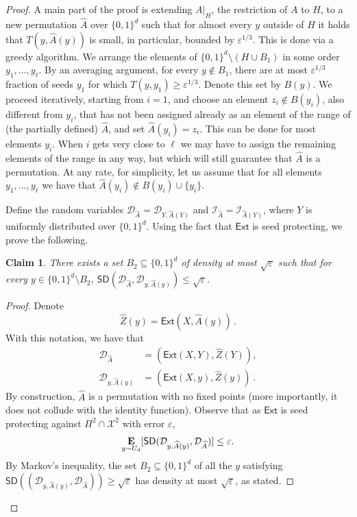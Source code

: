 \documentclass[11pt]{article}
\numberwithin{equation}{section}
\newtheorem{claim}[theorem]{Claim}
\theoremstyle{definition}
\theoremstyle{plain}
\newcommand{\ext}{\mathsf{Ext}}
\newcommand{\eps}{\varepsilon}
\newcommand{\perfam}{\Pi}
\newcommand{\nc}{\mathcal{X}}
\newcommand{\E}{\mathop{\bf E\/}}
\def\SD{\ensuremath{\mathsf{SD}}}
\begin{document}
\begin{proof}
                A main part of the proof is extending $A|_H$, the restriction of $A$ to $H$, to a new permutation $\widehat{A}$ over $\{0,1\}^d$ such that for almost every $y$ outside of $H$ it holds that $T(y,\widehat{A}(y))$ is small, in particular, bounded by $\eps^{1/3}$. This is done via a greedy algorithm. We arrange the elements of $\{0,1\}^d \setminus (H \cup B_1)$ in some order $y_1,\ldots,y_\ell$. By an averaging argument, for every $y \not\in B_1$, there are at most $\eps^{1/3}$ fraction of seeds $y_1$ for which $T(y,y_1) \ge \eps^{1/3}$. Denote this set by $B(y)$. We proceed iteratively, starting from $i = 1$, and choose an element $z_i \not\in B(y_i)$, also different from $y_i$, that has not been assigned already as %
an element of the range %
of (the partially defined) $\widehat{A}$, 
and set $\widehat{A}(y_i) = z_i$. This can be done for most
%
elements $y_i$.  %
%
%
When $i$ gets very close to $\ell$ we may have to assign the remaining 
%
elements of the range %
in any way, but which will still
%
 guarantee that $\widehat{A}$ is a permutation. At any rate, for simplicity, let us assume that for all elements $y_1,\ldots,y_\ell$ we have that $\widehat{A}(y_i) \not\in B(y_i) \cup \{y_i\}$.
		

Define the random variables $\mathcal{D}_{\widehat{A}} = \mathcal{D}_{Y,\widehat{A}(Y)}$ and 
$\mathcal{I}_{\widehat{A}} = \mathcal{I}_{\widehat{A}(Y)}$,
	where $Y$ is uniformly distributed over $\{0,1\}^d$. Using the fact that $\ext$ is seed protecting, we prove the following.
	
	\begin{claim}\label{claim:d is concentrated i}
		There exists a set $B_2 \subseteq \{0,1\}^d$ of density at most $\sqrt{\eps}$ such that for every $y \in \{0,1\}^d \setminus B_2$,
		$
		\SD(\mathcal{D}_{\widehat{A}}, \mathcal{D}_{y,\widehat{A}(y)}) \le \sqrt{\eps}.
		$
	\end{claim}
	
	\begin{proof}
		Denote 
\[
		\widehat{Z}(y) =\ext(X,\widehat{A}(y))\,.
\]
		With this notation, we have that
		\begin{align*}
		\mathcal{D}_{\widehat{A}} &= ( \ext(X,Y), \widehat{Z}(Y) ),\\
		\mathcal{D}_{y,\widehat{A}(y)} &= ( \ext(X,y), \widehat{Z}(y) )\,.
		\end{align*}
			By construction, $\widehat{A}$ is a permutation with no fixed points (more importantly, it does not collude with the identity function). Observe that as $\ext$ is seed protecting against $\perfam^2 \cap \nc^2$ with error $\eps$, 
		\[
		\E_{y\sim U_d}[\SD(\mathcal{D}_{y,\widehat{A}(y)}, \mathcal{D}_{\widehat{A}})] \leq \eps.
		\]
By Markov's inequality, the set $B_2 \subseteq \{0,1\}^d$ of %
all the $y$  %
satisfying
$
		\SD((\mathcal{D}_{y,\widehat{A}(y)}, \mathcal{D}_{\widehat{A}})) \geq \sqrt{\eps}
		$
		has density at most $\sqrt{\eps}$, as stated.
		

\end{proof}
\end{proof}
\end{document}
